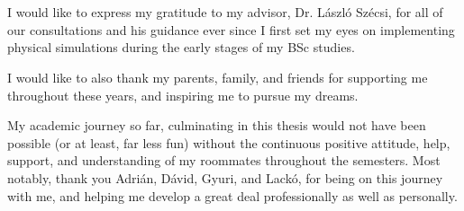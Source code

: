 \chapter*{\koszonetnyilvanitas}

I would like to express my gratitude to my advisor, Dr. László Szécsi, for all
of our consultations and his guidance ever since I first set my eyes on
implementing physical simulations during the early stages of my BSc studies.

I would like to also thank my parents, family, and friends for supporting me
throughout these years, and inspiring me to pursue my dreams.

My academic journey so far, culminating in this thesis would not have been
possible (or at least, far less fun) without the continuous positive attitude,
help, support, and understanding of my roommates throughout the semesters. Most
notably, thank you Adrián, Dávid, Gyuri, and Lackó, for being on this journey
with me, and helping me develop a great deal professionally as well as
personally.

